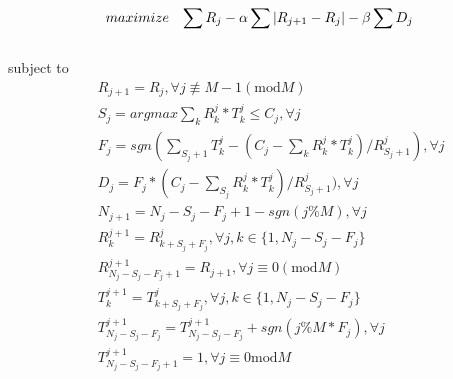 \begin{eqnarray}
& maximize & \sum R_j- \alpha\sum |R_{j+1}-R_j|-\beta\sum D_j
\label{vbr-formulation} \mylabel{vbr-formulation}
\end{eqnarray}
\\ subject to
\begin{eqnarray}
&& R_{j+1}=R_j, \forall j\not\equiv M-1 (\text{mod}M) \label{vbr-bitrate}\\
&& S_j = argmax{\sum_k R_k^j*T_k^j \leq C_j}, \forall j \label{vbr-send} \\
&& F_j = sgn(\sum_{S_j+1} T_k^j - (C_j- \sum_k R_k^j*T_k^j)/R_{S_j+1}^j), \forall j \label{vbr-drop}\\
&& D_j = F_j*(C_j- \sum_{S_j} R_k^j*T_k^j)/R_{S_j+1}^j), \forall j \label{vbr-drop-no} \\
&& N_{j+1}=N_j-S_j-F_j+1-sgn(j\%M), \forall j \label{vbr-gop-no}\\
&& R_k^{j+1}=R_{k+S_j+F_j}^j, \forall j, k\in \{1,N_j-S_j-F_j\} \label{vbr-bitrate-next}\\
&& R_{N_j-S_j-F_j+1}^{j+1} = R_{j+1}, \forall j \equiv 0(\text{mod}M) \label{vbr-bitrate-spec} \\
&& T_k^{j+1} = T_{k+S_j+F_j}^j, \forall j, k\in\{1, N_j-S_j-F_j\} \label{vbr-time-next} \\
&& T_{N_j-S_j-F_j}^{j+1} = T_{N_j-S_j-F_j}^{j+1} + sgn(j\%M*F_j), \forall j \label{vbr-time-spec}\\
&& T_{N_j-S_j-F_j+1}^{j+1}=1, \forall j\equiv 0 {\text{mod}M} \label{vbr-time-spec2} \\
\end{eqnarray}
